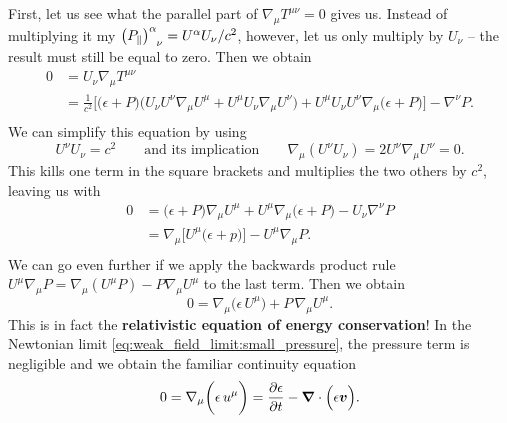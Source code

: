 First, let us see what the parallel part of $\nabla_\mu T^{\mu \nu} = 0$ gives us.
Instead of multiplying it my $\left(P_\parallel\right)\indices{^\alpha_\nu} = U^\alpha U_\nu /c^2$, however, let us only multiply by $U_\nu$ -- the result must still be equal to zero.
Then we obtain
\begin{equation}
\begin{split}
	0 &= U_\nu \nabla_\mu T^{\mu \nu} \\
	  &= \frac{1}{c^2} \bigg[ \Big( \epsilon + P \Big) \Big( U_\nu U^\nu \nabla_\mu U^\mu + U^\mu U_\nu \nabla_\mu U^\nu \Big) + U^\mu U_\nu U^\nu \nabla_\mu \Big( \epsilon + P \Big) \bigg] - \nabla^\nu P . \\
\end{split}
\end{equation}
We can simplify this equation by using
\begin{equation}
	U^\nu U_\nu = c^2 
	\qquad \text{and its implication} \qquad
	\nabla_\mu \left( U^\nu U_\nu \right) = 2 U^\nu \nabla_\mu U^\nu = 0 .
\label{eq:relfluid:tricks}
\end{equation}
This kills one term in the square brackets and multiplies the two others by $c^2$, leaving us with
\begin{equation}
\begin{split}
	  0 &= \Big(\epsilon + P \Big) \nabla_\mu U^\mu + U^\mu \nabla_\mu \Big( \epsilon + P \Big) - U_\nu \nabla^\nu P \\
	    &= \nabla_\mu \bigg[ U^\mu \Big( \epsilon + p \Big)  \bigg] - U^\mu \nabla_\mu P . \\
\end{split}
\end{equation}
We can go even further if we apply the backwards product rule $U^\mu \nabla_\mu P = \nabla_\mu (U^\mu P) - P \nabla_\mu U^\mu$ to the last term.
Then we obtain
\begin{equation}
	0 = \nabla_\mu \bigg( \epsilon \, U^\mu \bigg) + P \, \nabla_\mu U^\mu .
\end{equation}
This is in fact the \textbf{relativistic equation of energy conservation}!
In the Newtonian limit \eqref{eq:weak_field_limit:small_pressure}, the pressure term is negligible and we obtain the familiar continuity equation
\begin{equation}
	0 = \nabla_\mu \bigg( \epsilon \, u^\mu \bigg) = \pdv{\epsilon}{t} - {\bm{\nabla}} \cdot \Big( \epsilon {\bm{v}} \Big) .
\label{eq:relfluid:energy_conservation}
\end{equation}

